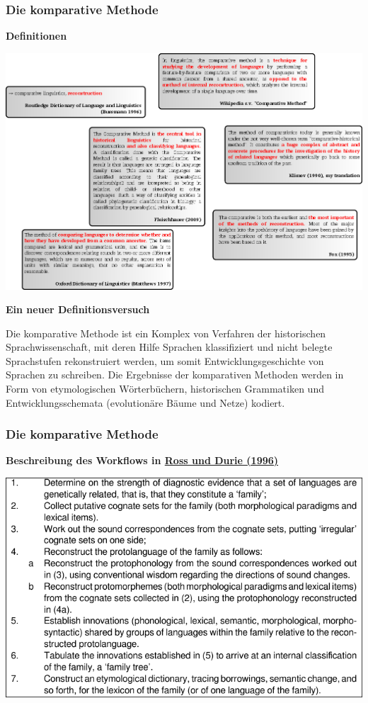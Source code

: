 \subsubsection{\texorpdfstring{{Die komparative
Methode}}{Die komparative Methode}}

\par\noindent\textbf{Definitionen}

\href{img/cm-wirr.png}{\includegraphics{img/cm-wirr.png}}



\par\noindent\textbf{Ein neuer Definitionsversuch}

Die komparative Methode ist ein Komplex von Verfahren der historischen
Sprachwissenschaft, mit deren Hilfe Sprachen klassifiziert und nicht
belegte Sprachstufen rekonstruiert werden, um somit
Entwicklungsgeschichte von Sprachen zu schreiben. Die Ergebnisse der
komparativen Methoden werden in Form von etymologischen Wörterbüchern,
historischen Grammatiken und Entwicklungsschemata (evolutionäre Bäume
und Netze) kodiert.


\subsubsection{\texorpdfstring{{Die komparative
Methode}}{Die komparative Methode}}

\par\noindent\textbf{Beschreibung des Workflows in
\href{http://bibliography.lingpy.org?key=Ross1996}{Ross und Durie
(1996)}}

\includegraphics[width=\textwidth]{img/rodu.pdf}



